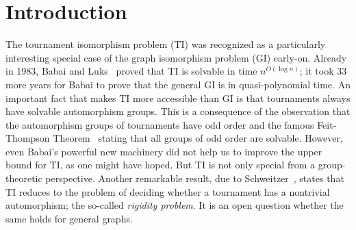 \PassOptionsToPackage{dvipsnames,svgnames}{xcolor}\documentclass[10pt,a4paper]{article}
\begin{document}
\section{Introduction}

The tournament isomorphism problem (TI) was recognized as a particularly interesting special case of the graph isomorphism problem (GI) early-on.
Already in 1983, Babai and Luks~\cite{BabaiL83} proved that TI is solvable in time $n^{O(\log n)}$;
it took 33 more years for Babai \cite{Babai16} to prove that the general GI is in quasi-polynomial time.
An important fact that makes TI more accessible than GI is that tournaments always have solvable automorphism groups.
This is a consequence of the observation that the automorphism groups of tournaments have odd order and the famous Feit-Thompson Theorem~\cite{FeitT63} stating that all groups of odd order are solvable.
However, even Babai's powerful new machinery did not help us to improve the upper bound for TI, as one might have hoped.
But TI is not only special from a group-theoretic perspective.
Another remarkable result, due to Schweitzer~\cite{Schweitzer17}, states that TI reduces to the problem of deciding whether a tournament has a nontrivial automorphism; the so-called \emph{rigidity problem}.
It is an open question whether the same holds for general graphs.
\end{document}
